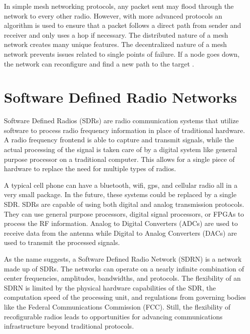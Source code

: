 In simple mesh networking protocols, any packet sent may flood through the network to every other radio. However, with more advanced protocols an algorithm is used to ensure that a packet follows a direct path from sender and receiver and only uses a hop if necessary. The distributed nature of a mesh network creates many unique features. The decentralized nature of a mesh network prevents issues related to single points of failure. If a node goes down, the network can reconfigure and find a new path to the target \cite{0033}. 


\section{Software Defined Radio Networks}

Software Defined Radios (SDRs) are radio communication systems that utilize software to process radio frequency information in place of traditional hardware. A radio frequency frontend is able to capture and transmit signals, while the actual processing of the signal is taken care of by a digital system like general purpose processor on a traditional computer. This allows for a single piece of hardware to replace the need for multiple types of radios.

A typical cell phone can have a bluetooth, wifi, gps, and cellular radio all in a very small package. In the future, these systems could be replaced by a single SDR. SDRs are capable of using both digital and analog transmission protocols. They can use general purpose processors, digital signal processors, or FPGAs to process the RF information. Analog to Digital Converters (ADCs) are used to receive data from the antenna while Digital to Analog Converters (DACs) are used to transmit the processed signals. 

As the name suggests, a Software Defined Radio Network (SDRN) is a network made up of SDRs. The networks can operate on a nearly infinite combination of center frequencies, amplitudes, bandwidths, and protocols. The flexibility of an SDRN is limited by the physical hardware capabilities of the SDR, the computation speed of the processing unit, and regulations from governing bodies like the Federal Communications Commission (FCC). Still, the flexibility of recofigurable radios leads to opportunities for advancing communications infrastructure beyond traditional protocols. 

